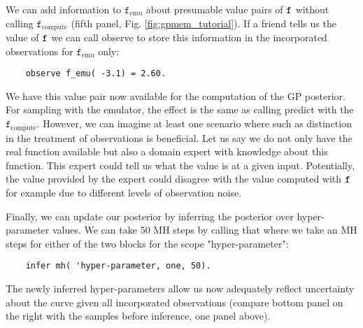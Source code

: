 We can add information to $\texttt{f}_\text{emu}$ about presumable value pairs of $\texttt{f}$ without calling $\texttt{f}_\text{compute}$
(fifth panel, Fig. \ref{fig:gpmem_tutorial}).
If a friend tells us the value of $\texttt{f}$ we can call observe to store this information in the incorporated observations for $\texttt{f}_\text{emu}$ only:
    \begin{lstlisting}
    observe f_emu( -3.1) = 2.60.
    \end{lstlisting}
We have this value pair now available for the computation of the \ac{GP} posterior. 
For sampling with the emulator, the effect is the same as calling predict with the $\texttt{f}_\text{compute}$.
However, we can imagine at least one scenario where such as distinction in the treatment of observations 
is beneficial. Let us say we do not only have the real function available but also a domain expert with knowledge 
about this function.
This expert could tell us what the value is at a given input.
Potentially, the value provided by the expert could disagree with the value computed with $\texttt{f}$ for example 
due to different levels of observation noise. 

Finally, we can update our posterior by inferring the posterior over hyper-parameter values.
We can take 50 \ac{MH} steps by calling that where we take an \ac{MH} steps for either of the two blocks for the scope "hyper-parameter": 
   \begin{lstlisting}
    infer mh( 'hyper-parameter, one, 50).
    \end{lstlisting}
The newly inferred hyper-parameters allow us now adequately reflect uncertainty about the curve given all incorporated observations (compare bottom panel on the right with the samples before inference, one panel above).
